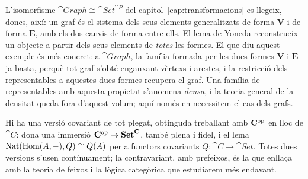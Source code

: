 \begin{exemple}
L'isomorfisme $\cat{Graph}\cong\cat{Set}^{\cat{P}}$ del capítol~\ref{cap:transformacions} es llegeix, doncs, així: un graf és el sistema dels seus elements generalitzats de forma $\mathbf V$ i de forma $\mathbf E$, amb els dos canvis de forma entre ells. El lema de Yoneda reconstrueix un objecte a partir dels seus elements de \emph{totes} les formes. El que diu aquest exemple és més concret: a $\cat{Graph}$, la família formada per les dues formes $\mathbf V$ i $\mathbf E$ ja basta, perquè tot graf s'obté enganxant vèrtexs i arestes, i la restricció dels representables a aquestes dues formes recupera el graf. Una família de representables amb aquesta propietat s'anomena \emph{densa}, i la teoria general de la densitat queda fora d'aquest volum; aquí només en necessitem el cas dels grafs.
\end{exemple}

\begin{observacio}
Hi ha una versió covariant de tot plegat, obtinguda treballant amb $\mathbf{C}^{\mathrm{op}}$ en lloc de $\cat{C}$: dona una immersió $\mathbf{C}^{\mathrm{op}}\to\mathbf{Set}^{\mathbf{C}}$, també plena i fidel, i el lema $\operatorname{Nat}(\operatorname{Hom}(A,-),Q)\cong Q(A)$ per a functors covariants $Q\colon\cat{C}\to\cat{Set}$. Totes dues versions s'usen contínuament; la contravariant, amb prefeixos, és la que enllaça amb la teoria de feixos i la lògica categòrica que estudiarem més endavant.
\end{observacio}

